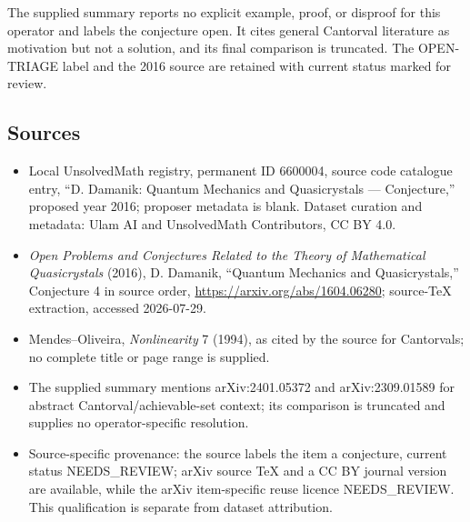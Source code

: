 \documentclass[11pt]{article}
\begin{document}
The supplied summary reports no explicit example, proof, or disproof for this operator and labels the conjecture open. It cites general Cantorval literature as motivation but not a solution, and its final comparison is truncated. The OPEN-TRIAGE label and the 2016 source are retained with current status marked for review.
\subsection{Sources}
\begin{itemize}
\item Local UnsolvedMath registry, permanent ID 6600004, source code catalogue entry, ``D. Damanik: Quantum Mechanics and Quasicrystals --- Conjecture,'' proposed year 2016; proposer metadata is blank. Dataset curation and metadata: Ulam AI and UnsolvedMath Contributors, CC BY 4.0.
\item \emph{Open Problems and Conjectures Related to the Theory of Mathematical Quasicrystals} (2016), D. Damanik, ``Quantum Mechanics and Quasicrystals,'' Conjecture 4 in source order, \url{https://arxiv.org/abs/1604.06280}; source-TeX extraction, accessed 2026-07-29.
\item Mendes--Oliveira, \emph{Nonlinearity} 7 (1994), as cited by the source for Cantorvals; no complete title or page range is supplied.
\item The supplied summary mentions arXiv:2401.05372 and arXiv:2309.01589 for abstract Cantorval/achievable-set context; its comparison is truncated and supplies no operator-specific resolution.
\item Source-specific provenance: the source labels the item a conjecture, current status NEEDS\_REVIEW; arXiv source TeX and a CC BY journal version are available, while the arXiv item-specific reuse licence NEEDS\_REVIEW. This qualification is separate from dataset attribution.
\end{itemize}
\end{document}
